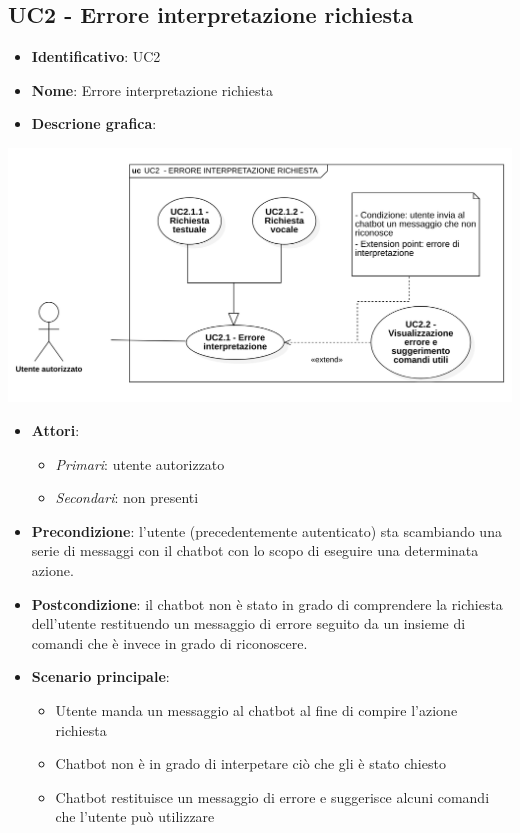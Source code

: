 \subsection{UC2 - Errore interpretazione richiesta}
\begin{itemize}
    \item \textbf{Identificativo}: UC2
    \item \textbf{Nome}: Errore interpretazione richiesta
    \item \textbf{Descrione grafica}:
\end{itemize}

\begin{center}
    \includegraphics[scale=0.50]{images/UC2.png} 
\end{center}

\begin{itemize}
    \item \textbf{Attori}:
    \begin{itemize} 
        \item \textit{Primari}: utente autorizzato
        \item \textit{Secondari}: non presenti
    \end{itemize}
 \item \textbf{Precondizione}: l'utente (precedentemente autenticato) sta scambiando una serie di messaggi con il chatbot con lo scopo di eseguire una determinata azione.
 \item \textbf{Postcondizione}: il chatbot non è stato in grado di comprendere la richiesta dell'utente restituendo un messaggio di errore seguito da un insieme di comandi che è invece in grado di riconoscere.   
 \item \textbf{Scenario principale}: 
    \begin{itemize}
        \item Utente manda un messaggio al chatbot al fine di compire l'azione richiesta
        \item Chatbot non è in grado di interpetare ciò che gli è stato chiesto 
        \item Chatbot restituisce un messaggio di errore e suggerisce alcuni comandi che l'utente può utilizzare
    \end{itemize}
\end{itemize}
\newpage